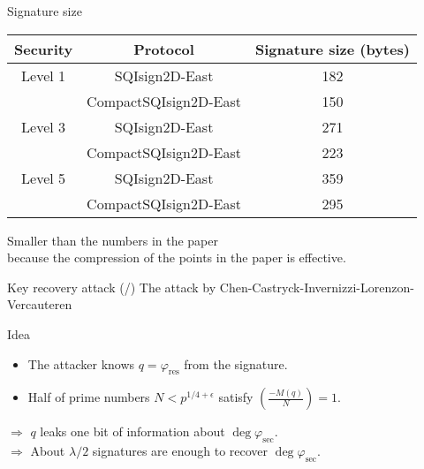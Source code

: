 \begin{frame}{Signature size}
    \begin{table}
        \begin{center}
            \begin{tabular}{c|c|c}
                Security & Protocol & Signature size (bytes)\\
                \hline
                Level 1 & SQIsign2D-East & 182\\[3pt]
                 & CompactSQIsign2D-East & 150\\[3pt]
                Level 3 & SQIsign2D-East & 271\\[3pt]
                    & CompactSQIsign2D-East & 223\\[3pt]
                Level 5 & SQIsign2D-East & 359\\[3pt]
                    & CompactSQIsign2D-East & 295\\
            \end{tabular}
        \end{center}
    \end{table}

    \vspace*{10pt}
    Smaller than the numbers in the paper\\
    because the compression of the points in the paper is effective.
\end{frame}

\newcommand*{\attacktotal}{\total{attackcnt}}
\begin{frame}{Key recovery attack (/\attacktotal{})}
    The attack by Chen-Castryck-Invernizzi-Lorenzon-Vercauteren

    \vspace{10pt}
    \begin{itembox}{Idea}
    \begin{itemize}
        \item The attacker knows $q = \varphi_\mathrm{res}$ from the signature.
        \item Half of prime numbers $N < p^{1/4+\epsilon}$ satisfy $\left(\frac{-M(q)}{N}\right) = 1$.
    \end{itemize}
    $\Rightarrow$ $q$ leaks one bit of information about $\deg\varphi_\mathrm{sec}$.\\[5pt]
    $\Rightarrow$ About $\lambda/2$ signatures are enough to recover $\deg\varphi_\mathrm{sec}$.
    \end{itembox}
\end{frame}

